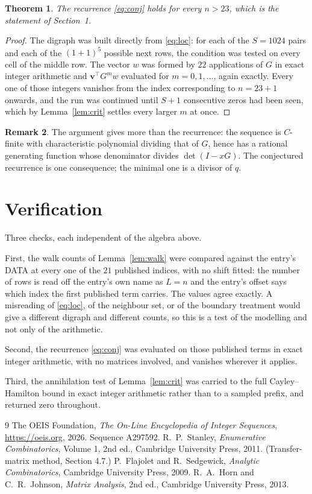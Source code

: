 \documentclass[11pt,a4paper]{article}
\theoremstyle{plain}
\newtheorem{theorem}{Theorem}
\theoremstyle{definition}
\newtheorem{remark}[theorem]{Remark}
\begin{document}
\begin{theorem}
The recurrence \eqref{eq:conj} holds for every $n>23$, which is the statement of
Section~1.
\end{theorem}

\begin{proof}
The digraph was built directly from \eqref{eq:loc}: for each of the $S=1024$ pairs and each
of the $(1+1)^{5}$ possible next rows, the condition was tested on every cell of
the middle row. The vector $w$ was formed by $22$ applications of $G$ in exact integer
arithmetic and $\mathbf{v}^{\!\top}G^{m}w$ evaluated for $m=0,1,\dots$, again exactly.
Every one of those integers vanishes from the index corresponding to $n=23+1$ onwards,
and the run was continued until $S+1$ consecutive zeros had been seen, which by
Lemma~\ref{lem:crit} settles every larger $m$ at once.
\end{proof}

\begin{remark}
The argument gives more than the recurrence: the sequence is $C$-finite with characteristic
polynomial dividing that of $G$, hence has a rational generating function whose denominator
divides $\det(I-xG)$. The conjectured recurrence is one consequence; the minimal one is a
divisor of $q$.
\end{remark}

\section{Verification}

Three checks, each independent of the algebra above.

First, the walk counts of Lemma~\ref{lem:walk} were compared against the entry's DATA at
every one of the $21$ published indices, with no shift fitted: the number of rows is
read off the entry's own name as $L=n$ and the entry's offset says which index the first
published term carries. The values agree exactly. A misreading of \eqref{eq:loc}, of the
neighbour set, or of the boundary treatment would give a different digraph and different
counts, so this is a test of the modelling and not only of the arithmetic.

Second, the recurrence \eqref{eq:conj} was evaluated on those published terms in exact
integer arithmetic, with no matrices involved, and vanishes wherever it applies.

Third, the annihilation test of Lemma~\ref{lem:crit} was carried to the full
Cayley--Hamilton bound in exact integer arithmetic rather than to a sampled prefix, and
returned zero throughout.

\begin{thebibliography}{9}
 The OEIS Foundation, \emph{The On-Line Encyclopedia of Integer
Sequences}, \url{https://oeis.org}, 2026. Sequence A297592.
 R.~P.~Stanley, \emph{Enumerative Combinatorics}, Volume 1, 2nd ed.,
Cambridge University Press, 2011. (Transfer-matrix method, Section 4.7.)
 P.~Flajolet and R.~Sedgewick, \emph{Analytic Combinatorics}, Cambridge
University Press, 2009.
 R.~A.~Horn and C.~R.~Johnson, \emph{Matrix Analysis}, 2nd ed., Cambridge
University Press, 2013.
\end{thebibliography}
\end{document}
